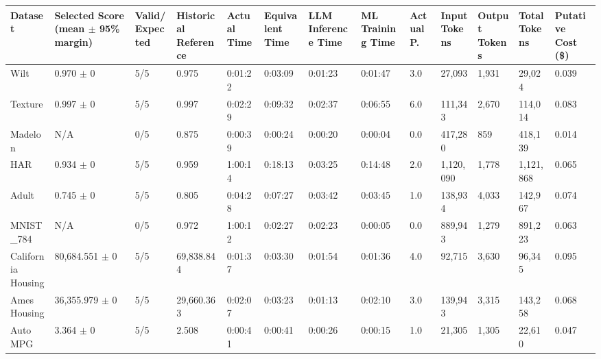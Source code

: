 \begin{tabular}{lllllllllllll}
\hline
Dataset & Selected Score (mean \ensuremath{\pm} 95\% margin) & Valid/Expected & Historical Reference & Actual Time & Equivalent Time & LLM Inference Time & ML Training Time & Actual P. & Input Tokens & Output Tokens & Total Tokens & Putative Cost (\$) \\
\hline
Wilt & 0.970 \ensuremath{\pm} 0 & 5/5 & 0.975 & 0:01:22 & 0:03:09 & 0:01:23 & 0:01:47 & 3.0 & 27,093 & 1,931 & 29,024 & 0.039 \\
Texture & 0.997 \ensuremath{\pm} 0 & 5/5 & 0.997 & 0:02:29 & 0:09:32 & 0:02:37 & 0:06:55 & 6.0 & 111,343 & 2,670 & 114,014 & 0.083 \\
Madelon & N/A & 0/5 & 0.875 & 0:00:39 & 0:00:24 & 0:00:20 & 0:00:04 & 0.0 & 417,280 & 859 & 418,139 & 0.014 \\
HAR & 0.934 \ensuremath{\pm} 0 & 5/5 & 0.959 & 1:00:14 & 0:18:13 & 0:03:25 & 0:14:48 & 2.0 & 1,120,090 & 1,778 & 1,121,868 & 0.065 \\
Adult & 0.745 \ensuremath{\pm} 0 & 5/5 & 0.805 & 0:04:28 & 0:07:27 & 0:03:42 & 0:03:45 & 1.0 & 138,934 & 4,033 & 142,967 & 0.074 \\
MNIST\_784 & N/A & 0/5 & 0.972 & 1:00:12 & 0:02:27 & 0:02:23 & 0:00:05 & 0.0 & 889,943 & 1,279 & 891,223 & 0.063 \\
California Housing & 80,684.551 \ensuremath{\pm} 0 & 5/5 & 69,838.844 & 0:01:37 & 0:03:30 & 0:01:54 & 0:01:36 & 4.0 & 92,715 & 3,630 & 96,345 & 0.095 \\
Ames Housing & 36,355.979 \ensuremath{\pm} 0 & 5/5 & 29,660.363 & 0:02:07 & 0:03:23 & 0:01:13 & 0:02:10 & 3.0 & 139,943 & 3,315 & 143,258 & 0.068 \\
Auto MPG & 3.364 \ensuremath{\pm} 0 & 5/5 & 2.508 & 0:00:41 & 0:00:41 & 0:00:26 & 0:00:15 & 1.0 & 21,305 & 1,305 & 22,610 & 0.047 \\
\hline
\end{tabular}
